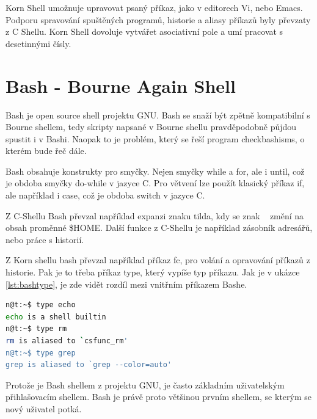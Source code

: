 \documentclass[thesis=M,czech]{FITthesis}[2012/06/26]
\begin{document}
Korn Shell umožnuje upravovat psaný příkaz, jako v editorech Vi, nebo Emacs. Podporu spravování spuštěných programů, historie a aliasy příkazů byly převzaty z C Shellu. Korn Shell dovoluje vytvářet asociativní pole a umí pracovat s desetinnými čísly.


%
%
%
\section{Bash - Bourne Again Shell}

Bash je open source shell projektu GNU. Bash se snaží být zpětně kompatibilní s Bourne shellem, tedy skripty napsané v Bourne shellu pravděpodobně půjdou spustit i v Bashi. Naopak to je problém, který se řeší program checkbashisms, o kterém bude řeč dále.

Bash obsahuje konstrukty pro smyčky. Nejen smyčky while a for, ale i until, což je obdoba smyčky do-while v jazyce C. Pro větvení lze použít klasický příkaz if, ale například i case, což je obdoba switch v jazyce C.

Z C-Shellu Bash převzal například expanzi znaku tilda, kdy se znak ~ změní na obsah proměnné \$HOME. Další funkce z C-Shellu je například zásobník adresářů, nebo práce s historií.

Z Korn shellu bash převzal například příkaz fc, pro volání a opravování příkazů z historie. Pak je to třeba příkaz type, který vypíše typ příkazu. Jak je v ukázce \ref{lst:bashtype}, je zde vidět rozdíl mezi vnitřním příkazem Bashe.

\begin{minipage}{\linewidth}
\begin{lstlisting}[language=bash, caption={Příkaz type v Bashi}, label={lst:bashtype}]
n@t:~$ type echo
echo is a shell builtin
n@t:~$ type rm
rm is aliased to `csfunc_rm'
n@t:~$ type grep
grep is aliased to `grep --color=auto'
\end{lstlisting}
\end{minipage}

Protože je Bash shellem z projektu GNU, je často základním uživatelským přihlašovacím shellem. Bash je právě proto většinou prvním shellem, se kterým se nový uživatel potká.


\end{document}
